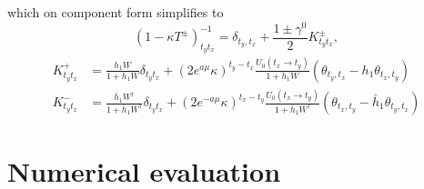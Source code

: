 %
which on component form simplifies to
%
\begin{equation}
  (1 - \kappa T^{\pm})^{-1}_{t_yt_x} = \delta_{t_y,t_x} + \frac{1 \pm \gamma^0}{2} K^{\pm}_{t_yt_x},
\end{equation}
%
\begin{align}
  K^+_{t_y t_x} &= \frac{h_1 W}{1 + h_1 W} \delta_{t_y t_x} +
  (2 e^{a\mu}\kappa)^{t_y-t_x}
  \frac{U_0(t_x \to t_y)}{1 + h_1 W}
  ( \theta_{t_y, t_x} - h_1 \theta_{t_x, t_y})\\
  K^-_{t_y t_x} &= \frac{\bar{h}_1 W^{\dagger}}{1 + \bar{h}_1 W^{\dagger}} \delta_{t_y t_x} +
  (2 e^{-a\mu}\kappa)^{t_x-t_y}
  \frac{U_0(t_x \to t_y)}{1 + \bar{h}_1 W^{\dagger}}
  ( \theta_{t_x, t_y} - \bar{h}_1 \theta_{t_y, t_x})
\end{align}




\section{Numerical evaluation}
